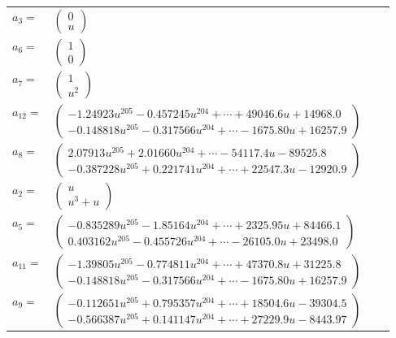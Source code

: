 \documentclass[1p]{elsarticle_modified}
\theoremstyle{definition}
\begin{document}
\begin{tabular}{m{7pt} m{180pt} m{7pt} m{180pt} }
\flushright $a_{3}=$&$\begin{pmatrix}0\\u\end{pmatrix}$ \\
\flushright $a_{6}=$&$\begin{pmatrix}1\\0\end{pmatrix}$ \\
\flushright $a_{7}=$&$\begin{pmatrix}1\\u^2\end{pmatrix}$ \\
\flushright $a_{12}=$&$\begin{pmatrix}-1.24923 u^{205}-0.457245 u^{204}+\cdots+49046.6 u+14968.0\\-0.148818 u^{205}-0.317566 u^{204}+\cdots-1675.80 u+16257.9\end{pmatrix}$ \\
\flushright $a_{8}=$&$\begin{pmatrix}2.07913 u^{205}+2.01660 u^{204}+\cdots-54117.4 u-89525.8\\-0.387228 u^{205}+0.221741 u^{204}+\cdots+22547.3 u-12920.9\end{pmatrix}$ \\
\flushright $a_{2}=$&$\begin{pmatrix}u\\u^3+u\end{pmatrix}$ \\
\flushright $a_{5}=$&$\begin{pmatrix}-0.835289 u^{205}-1.85164 u^{204}+\cdots+2325.95 u+84466.1\\0.403162 u^{205}-0.455726 u^{204}+\cdots-26105.0 u+23498.0\end{pmatrix}$ \\
\flushright $a_{11}=$&$\begin{pmatrix}-1.39805 u^{205}-0.774811 u^{204}+\cdots+47370.8 u+31225.8\\-0.148818 u^{205}-0.317566 u^{204}+\cdots-1675.80 u+16257.9\end{pmatrix}$ \\
\flushright $a_{9}=$&$\begin{pmatrix}-0.112651 u^{205}+0.795357 u^{204}+\cdots+18504.6 u-39304.5\\-0.566387 u^{205}+0.141147 u^{204}+\cdots+27229.9 u-8443.97\end{pmatrix}$ \\

\end{tabular}
\end{document}

